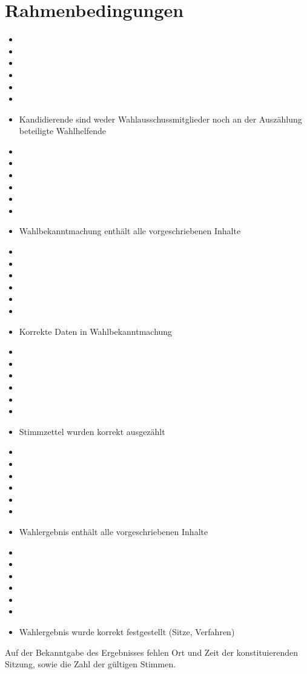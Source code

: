 \documentclass[a4paper]{scrartcl}
\newcommand{\fullcheck}{\raisebox{-.8\dp\strutbox}{\texttt{[image: Check.pdf]}}}
\newcommand{\semicheck}{\raisebox{-.8\dp\strutbox}{\texttt{[image: Semicheck.pdf]}}}
\newcommand{\nocheck}{\raisebox{-.8\dp\strutbox}{\texttt{[image: Nocheck.pdf]}}}
\newcommand{\dontknow}{\raisebox{-.8\dp\strutbox}{\texttt{[image: Dontknow.pdf]}}}
\newcommand{\notrev}{\raisebox{-.8\dp\strutbox}{\texttt{[image: Notrev.pdf]}}}
\newcommand{\sym}[1]{
\ifcase#1 \item[$\Box$]
\or \item[\fullcheck]
\or \item[\semicheck]
\or \item[\nocheck]
\or \item[\dontknow]
\or \item[\notrev]
\else \item[$\Box$]
\fi}
\begin{document}


\section{Rahmenbedingungen}
\begin{itemize}[label=$\Box$]

\sym{1} Kandidierende sind weder Wahlausschussmitglieder noch an der Auszählung beteiligte Wahlhelfende
\sym{4} Wahlbekanntmachung enthält alle vorgeschriebenen Inhalte
\sym{4} Korrekte Daten in Wahlbekanntmachung
\sym{4} Stimmzettel wurden korrekt ausgezählt
\sym{3} Wahlergebnis enthält alle vorgeschriebenen Inhalte
\sym{4} Wahlergebnis wurde korrekt festgestellt (Sitze, Verfahren)
\end{itemize}

Auf der Bekanntgabe des Ergebnisses fehlen Ort und Zeit der konstituierenden Sitzung, sowie die Zahl der gültigen Stimmen.








\end{document}
